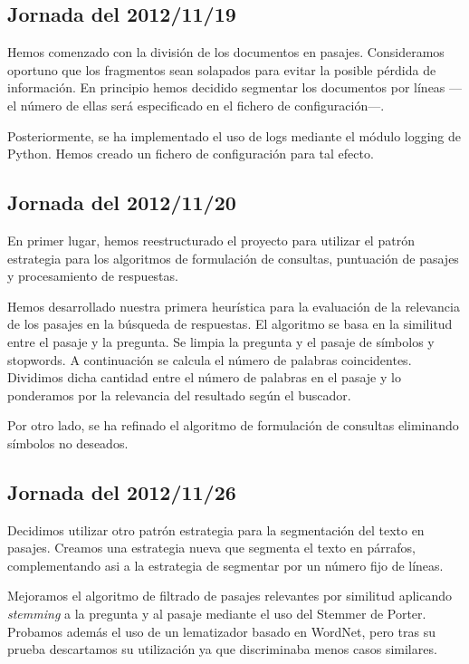 \documentclass[12pt,a4paper,titlepage]{article}
\begin{document}
\subsection{Jornada del 2012/11/19}
Hemos comenzado con la división de los documentos en pasajes. Consideramos oportuno que los fragmentos sean solapados para evitar la posible pérdida de información. En principio hemos decidido segmentar los documentos por líneas ---el número de ellas será especificado en el fichero de configuración---.

Posteriormente, se ha implementado el uso de logs mediante el módulo logging de Python. Hemos creado un fichero de configuración para tal efecto.

\subsection{Jornada del 2012/11/20}
En primer lugar, hemos reestructurado el proyecto para utilizar el patrón estrategia para los algoritmos de formulación de consultas, puntuación de pasajes y procesamiento de respuestas.

Hemos desarrollado nuestra primera heurística para la evaluación de la relevancia de los pasajes en la búsqueda de respuestas. El algoritmo se basa en la similitud entre el pasaje y la pregunta. Se limpia la pregunta y el pasaje de símbolos y stopwords. A continuación se calcula el número de palabras coincidentes. Dividimos dicha cantidad entre el número de palabras en el pasaje y lo ponderamos por la relevancia del resultado según el buscador.

Por otro lado, se ha refinado el algoritmo de formulación de consultas eliminando símbolos no deseados.

\subsection{Jornada del 2012/11/26}
Decidimos utilizar otro patrón estrategia para la segmentación del texto en pasajes. Creamos una estrategia nueva que segmenta el texto en párrafos, complementando asi a la estrategia de segmentar por un número fijo de líneas.

Mejoramos el algoritmo de filtrado de pasajes relevantes por similitud aplicando \emph{stemming} a la pregunta y al pasaje mediante el uso del Stemmer de Porter. Probamos además el uso de un lematizador basado en WordNet, pero tras su prueba descartamos su utilización ya que discriminaba menos casos similares.
\end{document}
